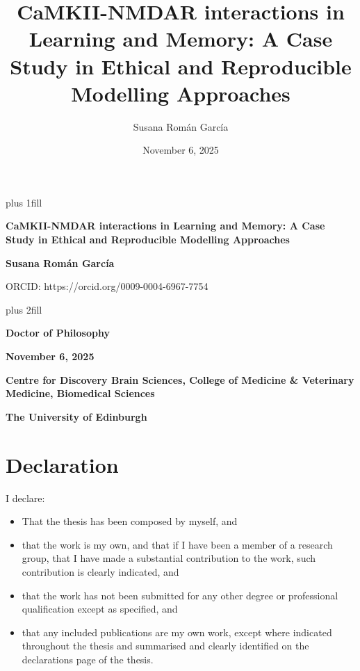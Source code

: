 \documentclass[
  11pt,
  letterpaper,
]{scrreprt}
\title{CaMKII-NMDAR interactions in Learning and Memory: A Case Study in
Ethical and Reproducible Modelling Approaches}
\author{Susana Román García}
\date{November 6, 2025}
\begin{document}
\cleardoublepage
\thispagestyle{empty}
{\centering
\hbox{}\vskip 0cm plus 1fill
{\Huge\bfseries CaMKII-NMDAR interactions in Learning and Memory: A Case
Study in Ethical and Reproducible Modelling Approaches \par}
\vspace{12ex}
{\Large\bfseries Susana Román García \par}
\vspace{3ex}
{\Large ORCID: https://orcid.org/0009-0004-6967-7754 \par}
\vskip 0cm plus 2fill
{\bfseries\large Doctor of Philosophy \par}
\vspace{3ex}
{\bfseries\large November 6, 2025 \par}
\vspace{12ex}
%
%
{\bfseries\large Centre for Discovery Brain Sciences, College of
Medicine \& Veterinary Medicine, Biomedical Sciences \par}
\vspace{3ex}
%
{\bfseries\large The University of Edinburgh \par}
%
\vspace{12ex}
{\small  \par}
}



\chapter*{Declaration}\label{declaration}


I declare:

\begin{itemize}
\item
  That the thesis has been composed by myself, and
\item
  that the work is my own, and that if I have been a member of a
  research group, that I have made a substantial contribution to the
  work, such contribution is clearly indicated, and
\item
  that the work has not been submitted for any other degree or
  professional qualification except as specified, and
\item
  that any included publications are my own work, except where indicated
  throughout the thesis and summarised and clearly identified on the
  declarations page of the thesis.
\end{itemize}
\end{document}
